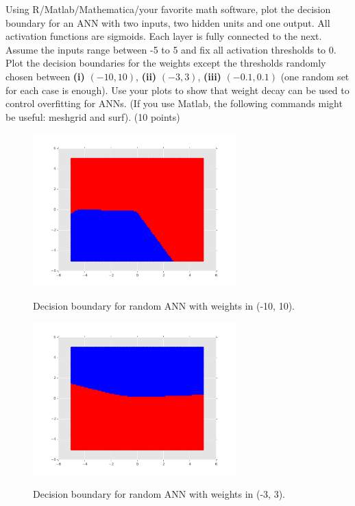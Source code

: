 \documentclass[fleqn]{homework}
\begin{document}
  \begin{problem}{4}
    \begin{question}
      Using R/Matlab/Mathematica/your favorite math software, plot the decision
      boundary for an ANN with two inputs, two hidden units and one output. All
      activation functions are sigmoids.  Each layer is fully connected to the
      next. Assume the inputs range between -5 to 5 and fix all activation
      thresholds to 0. Plot the decision boundaries for the weights except the
      thresholds randomly chosen between \textbf{(i)} $(−10,10)$, \textbf{(ii)}
      $(−3,3)$, \textbf{(iii)} $(−0.1,0.1)$ (one random set for each case is
      enough). Use your plots to show that weight decay can be used to control
      overfitting for ANNs. (If you use Matlab, the following commands might be
      useful: meshgrid and surf). (10 points)
    \end{question}

    \begin{figure}
      \centering
      \caption{Decision boundary for random ANN with weights in (-10, 10).}
      \includegraphics[width=0.7\textwidth]{10.pdf}
      \label{fig:10}
    \end{figure}

    \begin{figure}
      \centering
      \caption{Decision boundary for random ANN with weights in (-3, 3).}
      \includegraphics[width=0.7\textwidth]{3.pdf}
      \label{fig:3}
    \end{figure}


\end{problem}
\end{document}
